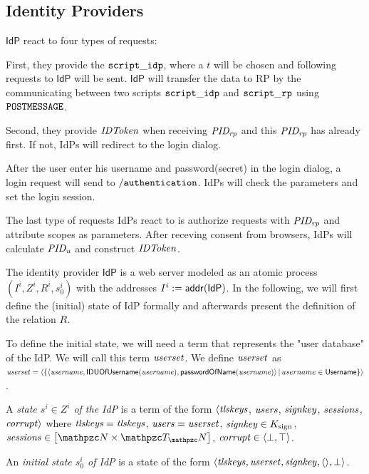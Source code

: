   \subsection{Identity Providers} \label{app:idps}
  $\mathsf{IdP}$ react to four types of requests:
  
  First, they provide the $\mathtt{script\_idp}$, where a $t$ 
  will be chosen and following requests to $\mathsf{IdP}$ 
  will be sent. $\mathsf{IdP}$ will transfer the data
  to RP by the communicating between two scripts $\mathtt{script\_idp}$ 
  and $\mathtt{script\_rp}$ using $\mathtt{POSTMESSAGE}$.
  
  Second, they provide $\mathit{IDToken}$ when receiving $\mathit{PID_{rp}}$ and this 
  $\mathit{PID_{rp}}$ has already first. If not, IdPs will redirect to the login dialog.
  
  After the user enter his username and password(secret) in the login dialog, a login
  request will send to $\mathtt{/authentication}$. IdPs will check the parameters and 
  set the login session.
  
  The last type of requests IdPs react to is authorize requests with $\mathit{PID_{rp}}$ and attribute
  scopes as parameters. After receving consent from browsers, IdPs will calculate 
  $\mathit{PID_{u}}$ and construct $\mathit{IDToken}$.
  
  The identity provider $\mathsf{IdP}$ is a web server 
  modeled as an atomic process $(I^i, Z^i, R^i, s^i_0)$ with 
  the addresses $I^i := \mathsf{addr}(\mathsf{IdP})$. 
 In the following, we 
  will first define the (initial) state of IdP formally and 
  afterwards present the definition of the relation $R$.
  
  To define the initial state, we will need a term that 
  represents the "user database" of the IdP. We will 
  call this term $\mathit{userset}$.   
  We define $\mathit{userset}$ as $\mathit{userset} = \langle\{\langle\mathit{username}, \mathsf{IDUOfUsername}(\mathit{username}), \mathsf{passwordOfName}(\mathit{username})\rangle\, |\, username \in \mathsf{Username}\}\rangle$.
  
  \begin{definition}\label{def:initial-state-idp}
    A \emph{state $s^i\in Z^i$ of the IdP} is a term of the form
    $\langle\mathit{tlskeys}$, $\mathit{users}$, $\mathit{signkey}$,
    $\mathit{sessions}$, $\mathit{corrupt}\rangle$ where 
    $\mathit{tlskeys} = \mathit{tlskeys} $, 
    $\mathit{users} = \mathit{userset}$, 
    $\mathit{signkey} \in K_{\text{sign}}$,
    $\mi{sessions}\in\dict{\nonces}{\terms}$, $\mathit{corrupt} \in \langle\bot,\top\rangle$.
  
    An \emph{initial state $s^i_0$ of IdP} is a state of the form 
    $\langle\mathit{tlskeys}, \mathit{userset}, \mathit{signkey}, \langle\rangle, \bot\rangle$.
  \end{definition}
  
